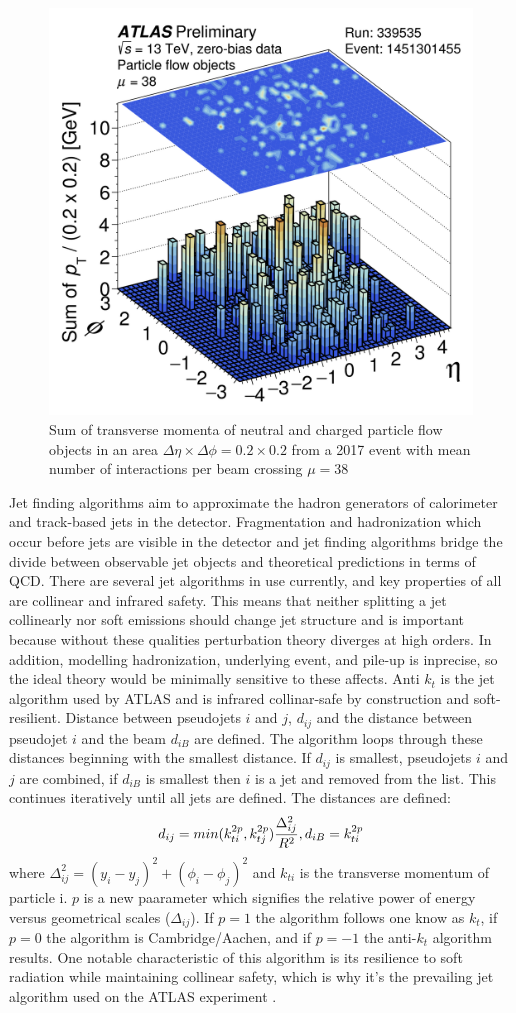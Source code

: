 \begin{figure}[!h]
        \centering
    \includegraphics[width=.4\textwidth]{Pictures/ParticleFlowExample.png}
    \caption{Sum of transverse momenta of neutral and charged particle flow objects in an area $\Delta \eta \times \Delta\phi = 0.2 \times 0.2$ from a 2017 event with mean number of interactions per beam crossing $\mu=38$ \cite{JETEtmiss}}
    \label{fig:ParticleFlowExample}
\end{figure}

Jet finding algorithms aim to approximate the hadron generators of calorimeter and track-based jets in the detector. Fragmentation and hadronization which occur before jets are visible in the detector and jet finding algorithms bridge the divide between observable jet objects and theoretical predictions in terms of QCD. There are several jet algorithms in use currently, and key properties of all are collinear and infrared safety. This means that neither splitting a jet collinearly nor soft emissions should change jet structure and is important because without these qualities perturbation theory diverges at high orders. In addition, modelling hadronization, underlying event, and pile-up is inprecise, so the ideal theory would be minimally sensitive to these affects. Anti $k_t$ is the jet algorithm used by ATLAS and is infrared collinar-safe by construction and soft-resilient. Distance between pseudojets $i$ and $j$, $d_{ij}$ and the distance between pseudojet $i$ and the beam $d_{iB}$ are defined. The algorithm loops through these distances beginning with the smallest distance. If $d_{ij}$ is smallest, pseudojets $i$ and $j$ are combined, if $d_{iB}$ is smallest then $i$ is a jet and removed from the list. This continues iteratively until all jets are defined. The distances are defined:
\begin{equation}
d_{ij} = min(k_{ti}^{2p},k_{tj}^{2p})\frac{\Delta_{ij}^2}{R^2} , \\
d_{iB} = k_{ti}^{2p}
\end{equation}
where $\Delta_{ij}^2 = (y_i-y_j)^2+(\phi_i-\phi_j)^2$ and $k_{ti}$ is the transverse momentum of particle i. $p$ is a new paarameter which signifies the relative power of energy versus geometrical scales ($\Delta_{ij}$). If $p=1$ the algorithm follows one know as $k_t$, if $p=0$ the algorithm is Cambridge/Aachen, and if $p=-1$ the anti-$k_t$ algorithm results. One notable characteristic of this algorithm is its resilience to soft radiation while maintaining collinear safety, which is why it's the prevailing jet algorithm used on the ATLAS experiment \cite{antikt}. 

